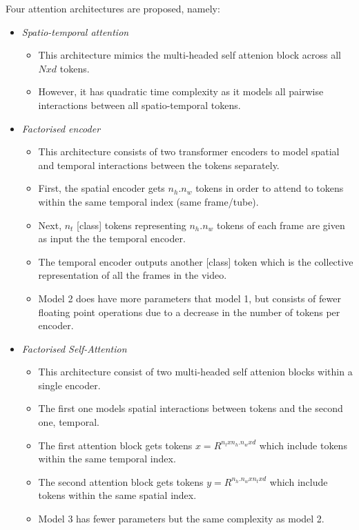 \par Four attention architectures are proposed, namely:
\begin{itemize}
    \item \textit{Spatio-temporal attention}
    \begin{itemize}
        \item This architecture mimics the multi-headed self attenion block \cite{tfm} across all ${Nxd}$ tokens.
        \item However, it has quadratic time complexity as it models all pairwise interactions between all spatio-temporal tokens.
    \end{itemize} 
    \item \textit{Factorised encoder}
    \begin{itemize}
        \item This architecture consists of two transformer encoders to model spatial and temporal interactions between the tokens separately.
        \item First, the spatial encoder gets $n_h.n_w$ tokens in order to attend to tokens within the same temporal index (same frame/tube).
        \item Next, $n_t$ [class] tokens representing $n_h.n_w$ tokens of each frame are given as input the the temporal encoder. 
        \item The temporal encoder outputs another [class] token which is the collective representation of all the frames in the video.
        \item Model 2 does have more parameters that model 1, but consists of fewer floating point operations due to a decrease in the number of tokens per encoder.
    \end{itemize}
    \item \textit{Factorised Self-Attention}
    \begin{itemize}
        \item This architecture consist of two multi-headed self attenion blocks within a single encoder.
        \item The first one models spatial interactions between tokens and the second one, temporal.
        \item The first attention block gets tokens $x = R^{n_txn_h.n_wxd}$ which include tokens within the same temporal index.
        \item The second attention block gets tokens $y = R^{n_h.n_wxn_txd}$ which include tokens within the same spatial index.
        \item Model 3 has fewer parameters but the same complexity as model 2.

\end{itemize}
\end{itemize}
